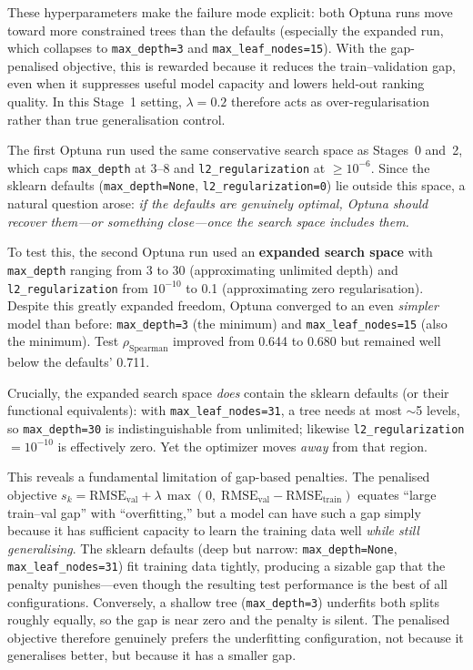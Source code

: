 \documentclass[11pt,a4paper]{article}
\newcommand{\rhoS}{\rho_{\text{Spearman}}}
\begin{document}
These hyperparameters make the failure mode explicit: both Optuna runs move
toward more constrained trees than the defaults (especially the expanded run,
which collapses to \texttt{max\_depth=3} and \texttt{max\_leaf\_nodes=15}).
With the gap-penalised objective, this is rewarded because it reduces the
train--validation gap, even when it suppresses useful model capacity and lowers
held-out ranking quality.  In this Stage~1 setting, $\lambda=0.2$ therefore
acts as over-regularisation rather than true generalisation control.

The first Optuna run used the same conservative search space as Stages~0 and~2,
which caps \texttt{max\_depth} at 3--8 and \texttt{l2\_regularization} at
$\geq 10^{-6}$.  Since the sklearn defaults
(\texttt{max\_depth=None}, \texttt{l2\_regularization=0}) lie outside this
space, a natural question arose: \emph{if the defaults are genuinely optimal,
      Optuna should recover them---or something close---once the search space
      includes them.}

To test this, the second Optuna run used an \textbf{expanded search space}
with \texttt{max\_depth} ranging from 3 to 30 (approximating
unlimited depth) and \texttt{l2\_regularization} from $10^{-10}$ to 0.1
(approximating zero regularisation).  Despite this greatly expanded freedom,
Optuna converged to an even \emph{simpler} model than before:
\texttt{max\_depth=3} (the minimum) and \texttt{max\_leaf\_nodes=15} (also
the minimum).  Test $\rhoS$ improved from 0.644 to 0.680 but remained
well below the defaults' 0.711.

Crucially, the expanded search space \emph{does} contain the sklearn
defaults (or their functional equivalents): with \texttt{max\_leaf\_nodes=31},
a tree needs at most $\sim$5 levels, so \texttt{max\_depth=30} is
indistinguishable from unlimited; likewise \texttt{l2\_regularization}
$= 10^{-10}$ is effectively zero.  Yet the optimizer moves \emph{away}
from that region.

This reveals a fundamental limitation of gap-based penalties.  The penalised
objective
$s_k = \text{RMSE}_{\text{val}} + \lambda\,\max(0,\;\text{RMSE}_{\text{val}}
      - \text{RMSE}_{\text{train}})$
equates ``large train--val gap'' with ``overfitting,'' but a model can have
such a gap simply because it has sufficient capacity to learn the training
data well \emph{while still generalising}.  The sklearn defaults (deep but
narrow: \texttt{max\_depth=None}, \texttt{max\_leaf\_nodes=31}) fit training
data tightly, producing a sizable gap that the penalty punishes---even though
the resulting test performance is the best of all configurations.
Conversely, a shallow tree (\texttt{max\_depth=3}) underfits both splits
roughly equally, so the gap is near zero and the penalty is silent.  The
penalised objective therefore genuinely prefers the underfitting
configuration, not because it generalises better, but because it has a
smaller gap.
\end{document}
